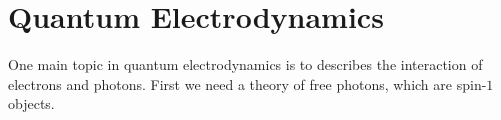 \documentclass[11pt, onesided]{book}
\theoremstyle{break}
\theoremstyle{break}
\newtheorem{thm}{Theorem}[section]
\begin{document}
%
%
%
%
%


\newpage
\chapter{Quantum Electrodynamics}
One main topic in quantum electrodynamics is to describes the interaction of electrons and photons. First we need a theory of free photons, which are spin-$1$ objects. 
\end{document}
